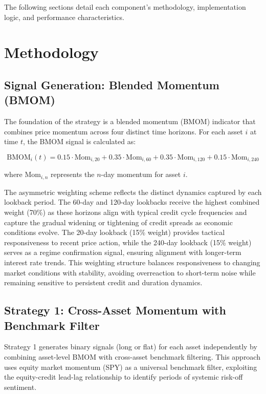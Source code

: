 \documentclass[11pt, letterpaper]{article}
\begin{document}
The following sections detail each component's methodology, implementation logic, and performance characteristics.

\newpage
\section{Methodology}

\subsection{Signal Generation: Blended Momentum (BMOM)}

The foundation of the strategy is a blended momentum (BMOM) indicator that combines price momentum across four distinct time horizons. For each asset $i$ at time $t$, the BMOM signal is calculated as:

\begin{equation}
\text{BMOM}_i(t) = 0.15 \cdot \text{Mom}_{i,20} + 0.35 \cdot \text{Mom}_{i,60} + 0.35 \cdot \text{Mom}_{i,120} + 0.15 \cdot \text{Mom}_{i,240}
\end{equation}

where $\text{Mom}_{i,n}$ represents the $n$-day momentum for asset $i$.

The asymmetric weighting scheme reflects the distinct dynamics captured by each lookback period. The 60-day and 120-day lookbacks receive the highest combined weight (70\%) as these horizons align with typical credit cycle frequencies and capture the gradual widening or tightening of credit spreads as economic conditions evolve. The 20-day lookback (15\% weight) provides tactical responsiveness to recent price action, while the 240-day lookback (15\% weight) serves as a regime confirmation signal, ensuring alignment with longer-term interest rate trends. This weighting structure balances responsiveness to changing market conditions with stability, avoiding overreaction to short-term noise while remaining sensitive to persistent credit and duration dynamics.

\subsection{Strategy 1: Cross-Asset Momentum with Benchmark Filter}

Strategy 1 generates binary signals (long or flat) for each asset independently by combining asset-level BMOM with cross-asset benchmark filtering. This approach uses equity market momentum (SPY) as a universal benchmark filter, exploiting the equity-credit lead-lag relationship to identify periods of systemic risk-off sentiment.
\end{document}
